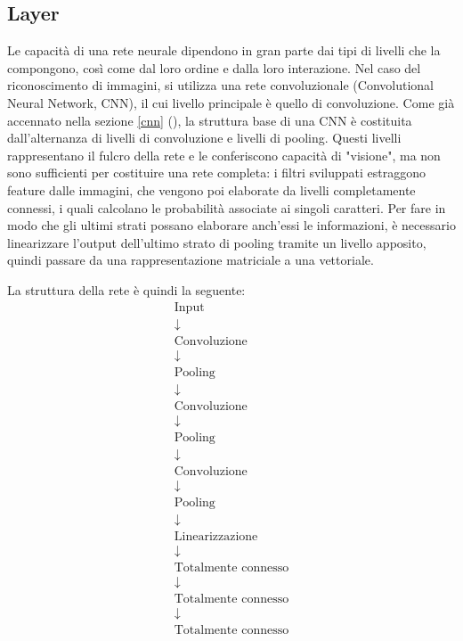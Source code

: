 \documentclass[a4paper,12pt]{article}
\begin{document}
\subsection{Layer}
Le capacità di una rete neurale dipendono in gran parte dai tipi di livelli che la compongono, così come dal loro ordine e dalla loro interazione.
Nel caso del riconoscimento di immagini, si utilizza una rete convoluzionale (Convolutional Neural Network, CNN), il cui livello principale è quello di convoluzione.
Come già accennato nella sezione \ref{cnn} (), la struttura base di una CNN è costituita dall'alternanza di livelli di convoluzione e livelli di pooling.
Questi livelli rappresentano il fulcro della rete e le conferiscono capacità di "visione", ma non sono sufficienti per costituire una rete completa: i filtri sviluppati estraggono feature dalle immagini, che vengono poi elaborate da livelli completamente connessi, i quali calcolano le probabilità associate ai singoli caratteri.
Per fare in modo che gli ultimi strati possano elaborare anch'essi le informazioni, è necessario linearizzare l'output dell'ultimo strato di pooling tramite un livello apposito, quindi passare da una rappresentazione matriciale a una vettoriale.

La struttura della rete è quindi la seguente:
\begin{gather*}
    \text{Input} \\
    \downarrow \\
    \text{Convoluzione} \\
    \downarrow \\
    \text{Pooling} \\
    \downarrow \\
    \text{Convoluzione} \\
    \downarrow \\
    \text{Pooling} \\
    \downarrow \\
    \text{Convoluzione} \\
    \downarrow \\
    \text{Pooling} \\
    \downarrow \\
    \text{Linearizzazione} \\
    \downarrow \\
    \text{Totalmente connesso} \\
    \downarrow \\
    \text{Totalmente connesso} \\
    \downarrow \\
    \text{Totalmente connesso}
\end{gather*}
\end{document}
